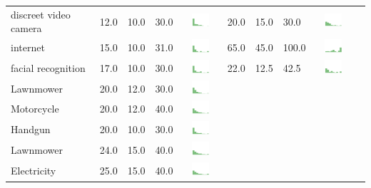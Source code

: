 \begin{table}[t]
\begin{center}
\begin{tabular}{| p{2cm} | p{1cm} | p{1cm} | p{1cm} | c | p{2cm} | p{1cm} | p{1cm} | p{1cm} | c |}
discreet video camera & 12.0 & 10.0 & 30.0 & \includegraphics[width = 2cm, height = 0.5cm]{tables/discreetvideocamerarisk} & 20.0 & 15.0 & 30.0 & \includegraphics[width = 2cm, height = 0.5cm]{tables/discreetvideocameraben} \\ 
internet & 15.0 & 10.0 & 31.0 & \includegraphics[width = 2cm, height = 0.5cm]{tables/internetrisk} & 65.0 & 45.0 & 100.0 & \includegraphics[width = 2cm, height = 0.5cm]{tables/internetben} \\ 
facial recognition & 17.0 & 10.0 & 30.0 & \includegraphics[width = 2cm, height = 0.5cm]{tables/facialrecognitionrisk} & 22.0 & 12.5 & 42.5 & \includegraphics[width = 2cm, height = 0.5cm]{tables/facialrecognitionben} \\ 
Lawnmower & 20.0 & 12.0 & 30.0 & \includegraphics[width = 2cm, height = 0.5cm]{tables/LawnmowerRisk} \\ 
Motorcycle & 20.0 & 12.0 & 40.0 & \includegraphics[width = 2cm, height = 0.5cm]{tables/MotorcycleBenefit} \\ 
Handgun & 20.0 & 10.0 & 30.0 & \includegraphics[width = 2cm, height = 0.5cm]{tables/HandgunBenefit} \\ 
Lawnmower & 24.0 & 15.0 & 40.0 & \includegraphics[width = 2cm, height = 0.5cm]{tables/LawnmowerBenefit} \\ 
Electricity & 25.0 & 15.0 & 40.0 & \includegraphics[width = 2cm, height = 0.5cm]{tables/ElectricityRisk} \\ 

\end{tabular}
\end{center}
\end{table}
